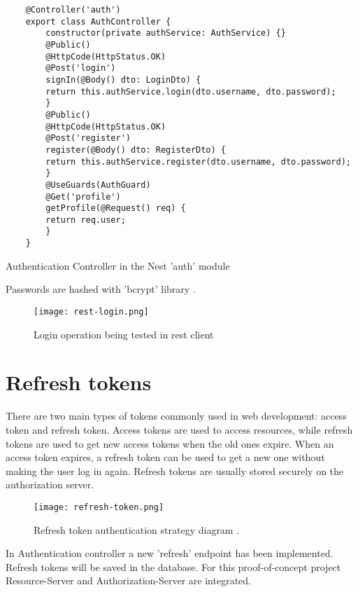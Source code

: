 \begin{listing}[H]
    \begin{verbatim}
    @Controller('auth')
    export class AuthController {
        constructor(private authService: AuthService) {}
        @Public()
        @HttpCode(HttpStatus.OK)
        @Post('login')
        signIn(@Body() dto: LoginDto) {
        return this.authService.login(dto.username, dto.password);
        }
        @Public()
        @HttpCode(HttpStatus.OK)
        @Post('register')
        register(@Body() dto: RegisterDto) {
        return this.authService.register(dto.username, dto.password);
        }
        @UseGuards(AuthGuard)
        @Get('profile')
        getProfile(@Request() req) {
        return req.user;
        }
    }
    \end{verbatim}
\caption[Authentication Controller in Nest module]{Authentication Controller in the Nest 'auth' module}
\end{listing}


Passwords are hashed with 'bcrypt' library \autocite{bcryptTemoye}.


\begin{figure}[H]
    \centering
    \texttt{[image: rest-login.png]}
    \caption[Login operation in rest client]{\label{fig:restlogin} Login operation being tested in rest client }
\end{figure}


\section{{Refresh tokens}}%
\label{sec:refreshtoken}

There are two main types of tokens commonly used in web development: access token and refresh token. Access tokens are used to access resources, while refresh tokens are used to get new access tokens when the old ones expire. When an access token expires, a refresh token can be used to get a new one without making the user log in again. Refresh tokens are usually stored securely on the authorization server.

\begin{figure}[H]
    \centering
    \texttt{[image: refresh-token.png]}
    \caption[Refresh token authentication strategy diagram ]{\label{fig:refreshtoken} Refresh token authentication strategy diagram \autocite{RoyRefreshToken}. }
\end{figure}

In Authentication controller a new 'refresh' endpoint has been implemented. Refresh tokens will be saved in the database. For this proof-of-concept project Resource-Server and Authorization-Server are integrated.


